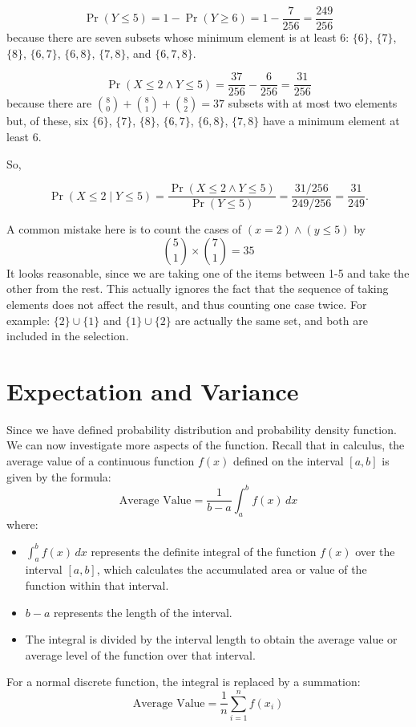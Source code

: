 \begin{solution}
\begin{enumerate}
    \[
    \Pr(Y \leq 5) = 1 - \Pr(Y \geq 6) = 1 - \frac{7}{256} = \frac{249}{256}
    \]
    because there are seven subsets whose minimum element is at least 6: $\{6\}$, $\{7\}$, $\{8\}$, $\{6,7\}$, $\{6,8\}$, $\{7,8\}$, and $\{6,7,8\}$.

    \[
    \Pr(X \leq 2 \land Y \leq 5) = \frac{37}{256} - \frac{6}{256} = \frac{31}{256}
    \]
    because there are $\binom{8}{0} + \binom{8}{1} + \binom{8}{2} = 37$ subsets with at most two elements but, of these, six $\{6\}$, $\{7\}$, $\{8\}$, $\{6,7\}$, $\{6,8\}$, $\{7,8\}$ have a minimum element at least 6.

    So,

    \[
    \Pr(X \leq 2 \mid Y \leq 5) = \frac{\Pr(X \leq 2 \land Y \leq 5)}{\Pr(Y \leq 5)} = \frac{31/256}{249/256} = \frac{31}{249}.
    \]
\end{enumerate}
\begin{remark}
    A common mistake here is to count the cases of $(x=2)\land (y\leq5)$ by \[\binom{5}{1} \times \binom{7}{1}=35\]
    It looks reasonable, since we are taking one of the items between 1-5 and take the other from the rest. This actually ignores the fact that the sequence of taking elements does not affect the result, and thus counting one case twice. For example: $\{2\} \cup \{1\}$ and $\{1\} \cup \{2\}$ are actually the same set,  and both are included in the selection.
\end{remark}
\end{solution}

\section{Expectation and Variance}
Since we have defined probability distribution and probability density function. We can now investigate more aspects of the function. Recall that in calculus, the average value of a continuous function $f(x)$ defined on the interval $[a, b]$ is given by the formula:
\begin{equation}
\text{Average Value} = \frac{1}{b - a} \int_{a}^{b} f(x) \, dx
\end{equation}
where:
\begin{itemize}
    \item $\int_{a}^{b} f(x) \, dx$ represents the definite integral of the function $f(x)$ over the interval $[a, b]$, which calculates the accumulated area or value of the function within that interval.
    \item $b - a$ represents the length of the interval.
    \item The integral is divided by the interval length to obtain the average value or average level of the function over that interval.
\end{itemize}
For a normal discrete function, the integral is replaced by a summation:
\begin{equation}\label{dissum}
\text{Average Value} = \frac{1}{n} \sum_{i=1}^{n} f(x_i)
\end{equation}

